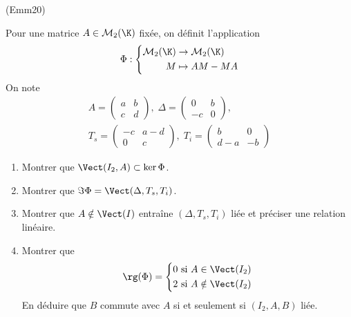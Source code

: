 \begin{tiny}(Emm20)\end{tiny} Pour une matrice $A\in \mathcal{M}_2(\K)$ fixée, on définit l'application
\begin{displaymath}
  \Phi:
\left\lbrace 
\begin{aligned}
\mathcal{M}_2(\K) &\rightarrow \mathcal{M}_2(\K) \\
M &\mapsto AM -MA
\end{aligned}
\right. 
\end{displaymath}
On note
\begin{multline*}
  A =
\begin{pmatrix}
a & b \\ c & d  
\end{pmatrix},\;
\Delta =
\begin{pmatrix}
0 & b \\ -c & 0  
\end{pmatrix},\\
T_s =
\begin{pmatrix}
-c & a-d \\ 0 & c  
\end{pmatrix},\;
T_i =
\begin{pmatrix}
b & 0 \\ d-a & -b  
\end{pmatrix} 
\end{multline*}

\begin{enumerate}
  \item Montrer que $\Vect(I_2,A)\subset \ker \Phi$.
  \item Montrer que $\Im \Phi = \Vect(\Delta, T_s, T_i)$.
  \item Montrer que $A\notin \Vect(I)$ entraîne $(\Delta, T_s, T_i)$ liée et préciser une relation linéaire.
  \item Montrer que
\begin{displaymath}
\rg(\Phi) = 
\left\lbrace 
\begin{aligned}
0 &\text{ si } A\in \Vect(I_2) \\ 2 &\text{ si } A\notin \Vect(I_2)  
\end{aligned}
\right. 
\end{displaymath}
En déduire que $B$ commute avec $A$ si et seulement si $(I_2,A,B)$ liée.
\end{enumerate}
